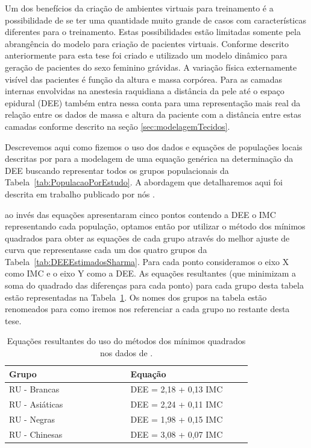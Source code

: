 Um dos benefícios da criação de ambientes virtuais para treinamento é a possibilidade de se ter uma quantidade muito grande de casos com características diferentes para o treinamento. Estas possibilidades estão limitadas somente pela abrangência do modelo para criação de pacientes virtuais. Conforme descrito anteriormente para esta tese foi criado e utilizado um modelo dinâmico para geração de pacientes do sexo feminino grávidas. A variação física externamente visível das pacientes é função da altura e massa corpórea. Para as camadas internas envolvidas na anestesia raquidiana a distância da pele até o espaço epidural (\acrshort{DEE}) também entra nessa conta para uma representação mais real da relação entre os dados de massa e altura da paciente com a distância entre estas camadas conforme descrito na seção \ref{sec:modelagemTecidos}. 

Descrevemos aqui como fizemos o uso dos dados e equações de populações locais descritas por \textcite{Clinkscales2007, Sharma2011, Hazarika2016} para a modelagem de uma equação genérica na determinação da \acrshort{DEE} buscando representar todos os grupos populacionais da Tabela~\ref{tab:PopulacaoPorEstudo}.
A abordagem que detalharemos aqui foi descrita em trabalho publicado por nós \cite{Melo2020}.

\textcite{Sharma2011} ao invés das equações apresentaram cinco pontos contendo a \acrshort{DEE} o \acrshort{IMC} representando cada população, optamos então por utilizar o método dos mínimos quadrados para obter as equações de cada grupo através do melhor ajuste de curva que representasse cada um dos quatro grupos da Tabela~\ref{tab:DEEEstimadosSharma}. Para cada ponto consideramos o eixo X como \acrshort{IMC} e o eixo Y como a \acrshort{DEE}. As equações resultantes (que minimizam a soma do quadrado das diferenças para cada ponto) para cada grupo desta tabela estão representadas na Tabela~\ref{tab:DEEEquacoesMinimosQuadrados}. Os nomes dos grupos na tabela estão renomeados para como iremos nos referenciar a cada grupo no restante desta tese.

\begin{table}[!ht]
\begin{center}
\caption{Equações resultantes do uso do métodos dos mínimos quadrados nos dados de \textcite{Sharma2011}.}
\label{tab:DEEEquacoesMinimosQuadrados}
\begin{tabular}{|p{0.4\linewidth}|p{0.4\linewidth}|}
\hline
\textbf{Grupo} & \textbf{Equação}\\
\hline\hline
RU - Brancas & DEE = 2,18 + 0,13 IMC\\
RU - Asiáticas & DEE = 2,24 + 0,11 IMC\\
RU - Negras & DEE = 1,98 + 0,15 IMC\\
RU - Chinesas & DEE = 3,08 + 0,07 IMC\\
\hline
\end{tabular}
\end{center}
\end{table}

